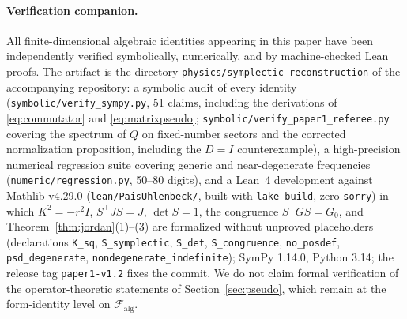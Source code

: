 \documentclass[11pt]{article}
\theoremstyle{definition}
\theoremstyle{remark}
\begin{document}
\paragraph{Verification companion.}
All finite-dimensional algebraic identities appearing in this paper have been
independently verified symbolically, numerically, and by machine-checked
Lean proofs.  The artifact is the directory
\texttt{physics/symplectic-reconstruction} of the accompanying repository:
a symbolic audit of every identity
(\texttt{symbolic/verify\_sympy.py}, 51 claims, including the derivations
of \eqref{eq:commutator} and \eqref{eq:matrixpseudo};
\texttt{symbolic/verify\_paper1\_referee.py} covering the spectrum of $Q$
on fixed-number sectors and the corrected normalization proposition,
including the $D=I$ counterexample), a high-precision
numerical regression suite covering generic and near-degenerate
frequencies (\texttt{numeric/regression.py}, 50--80 digits),
and a Lean~4 development against Mathlib v4.29.0
(\texttt{lean/PaisUhlenbeck/}, built with \texttt{lake build}, zero
\texttt{sorry}) in which $K^2=-r^2I$, $S^{\top}JS=J$,
$\det S=1$, the congruence $S^{\top}GS=G_0$, and
Theorem~\ref{thm:jordan}(1)--(3) are formalized without unproved
placeholders (declarations \texttt{K\_sq}, \texttt{S\_symplectic},
\texttt{S\_det}, \texttt{S\_congruence}, \texttt{no\_posdef},
\texttt{psd\_degenerate}, \texttt{nondegenerate\_indefinite}); SymPy
1.14.0, Python 3.14; the release tag \texttt{paper1-v1.2} fixes the
commit.  We do not claim formal verification of the operator-theoretic
statements of Section~\ref{sec:pseudo}, which remain at the
form-identity level on $\mathcal F_{\mathrm{alg}}$.
\end{document}
